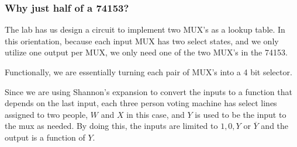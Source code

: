 \documentclass[12pt]{article}
\begin{document}
\subsubsection*{Why just half of a 74153?}
The lab has us design a circuit to implement two MUX's as a lookup table. In
this orientation, because each input MUX has two select states, and we only
utilize one output per MUX, we only need one of the two MUX's in the 74153.

Functionally, we are essentially turning each pair of MUX's into a 4 bit
selector.

Since we are using Shannon's expansion to convert the inputs to a function that
depends on the last input, each three person voting machine has select lines
assigned to two people, \(W\) and \(X\) in this case, and \(Y\) is used to be the
input to the mux as needed. By doing this, the inputs are limited to \(1, 0, Y
\) or  \(\overline{Y}\) and the output is a function of \(Y\).
\end{document}
